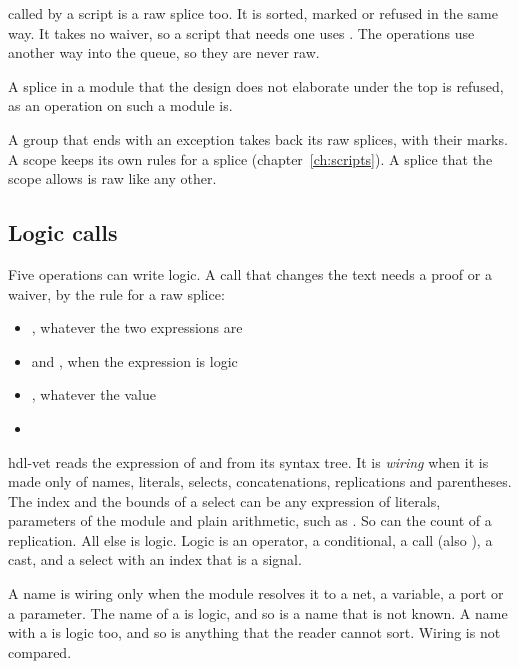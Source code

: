  called by a script is a raw splice too. It is sorted, marked or
refused in the same way. It takes no waiver, so a script that needs one uses
. The operations use another way into the queue, so they are never raw.

A splice in a module that the design does not elaborate under the top is refused, as an
operation on such a module is.

A group that ends with an exception takes back its raw splices, with their marks. A scope
keeps its own rules for a splice (chapter~\ref{ch:scripts}). A splice that the scope allows
is raw like any other.

\subsection*{Logic calls}
\label{sec:logicops}

Five operations can write logic. A call that changes the text needs a proof or a waiver, by
the rule for a raw splice:

\begin{itemize}
\item {}, whatever the two expressions are
\item {} and , when the expression is
  logic
\item {}, whatever the value
\item {}
\end{itemize}

hdl-vet reads the expression of  and 
from its syntax tree. It is \emph{wiring} when it is made only of names, literals, selects,
concatenations, replications and parentheses. The index and the bounds of a select can be
any expression of literals, parameters of the module and plain arithmetic, such as
. So can the count of a replication. All else is logic. Logic is an operator,
a conditional, a call (also ), a cast, and a select with an index that is a
signal.

A name is wiring only when the module resolves it to a net, a variable, a port or a
parameter. The name of a  is logic, and so is a name that is not known. A name
with a  is logic too, and so is anything that the reader cannot
sort. Wiring is not compared.



